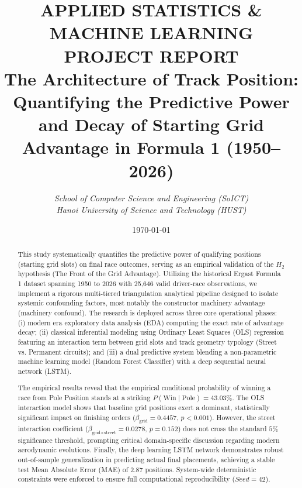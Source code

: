 \documentclass[11pt,a4paper]{article}
\title{
    \vspace{-15mm}
    \textbf{\large APPLIED STATISTICS \& MACHINE LEARNING PROJECT REPORT}\\
    \vspace{5mm}
    \LARGE \textbf{The Architecture of Track Position: Quantifying the Predictive Power and Decay of Starting Grid Advantage in Formula 1 (1950--2026)}
}
\author{
    \textit{School of Computer Science and Engineering (SoICT)} \\
    \textit{Hanoi University of Science and Technology (HUST)}
}
\date{\today}
\begin{document}
\maketitle

\begin{abstract}
\noindent This study systematically quantifies the predictive power of qualifying positions (starting grid slots) on final race outcomes, serving as an empirical validation of the $H_2$ hypothesis (The Front of the Grid Advantage). Utilizing the historical Ergast Formula 1 dataset spanning 1950 to 2026 with 25,646 valid driver-race observations, we implement a rigorous multi-tiered triangulation analytical pipeline designed to isolate systemic confounding factors, most notably the constructor machinery advantage (machinery confound). The research is deployed across three core operational phases: (i) modern era exploratory data analysis (EDA) computing the exact rate of advantage decay; (ii) classical inferential modeling using Ordinary Least Squares (OLS) regression featuring an interaction term between grid slots and track geometry typology (Street vs. Permanent circuits); and (iii) a dual predictive system blending a non-parametric machine learning model (Random Forest Classifier) with a deep sequential neural network (LSTM).

\noindent The empirical results reveal that the empirical conditional probability of winning a race from Pole Position stands at a striking $P(\text{Win} \mid \text{Pole}) = 43.03\%$. The OLS interaction model shows that baseline grid positions exert a dominant, statistically significant impact on finishing orders ($\beta_{\text{grid}} = 0.4457$, $p < 0.001$). However, the street interaction coefficient ($\beta_{\text{grid} \times \text{street}} = 0.0278$, $p = 0.152$) does not cross the standard $5\%$ significance threshold, prompting critical domain-specific discussion regarding modern aerodynamic evolutions. Finally, the deep learning LSTM network demonstrates robust out-of-sample generalization in predicting actual final placements, achieving a stable test Mean Absolute Error (MAE) of $2.87$ positions. System-wide deterministic constraints were enforced to ensure full computational reproducibility ($Seed = 42$).
\end{abstract}

\vspace{5mm}
\vspace{10mm}

\newpage
\tableofcontents %
\end{document}
